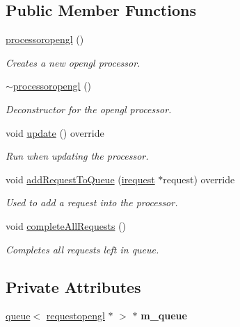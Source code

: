 \subsection*{Public Member Functions}
\begin{DoxyCompactItemize}
\item 
\hyperlink{classflounder_1_1processoropengl_a6cae6b14a140e49a2d8695c2be1816b2}{processoropengl} ()
\begin{DoxyCompactList}\small\item\em Creates a new opengl processor. \end{DoxyCompactList}\item 
\hyperlink{classflounder_1_1processoropengl_a6ee7c280950f4579915069d83225eaec}{$\sim$processoropengl} ()
\begin{DoxyCompactList}\small\item\em Deconstructor for the opengl processor. \end{DoxyCompactList}\item 
void \hyperlink{classflounder_1_1processoropengl_ad3ca7ada749d785e44fa2b536839f684}{update} () override
\begin{DoxyCompactList}\small\item\em Run when updating the processor. \end{DoxyCompactList}\item 
void \hyperlink{classflounder_1_1processoropengl_a5063ad5c1f350f26733a748a7e039a9a}{add\+Request\+To\+Queue} (\hyperlink{classflounder_1_1irequest}{irequest} $\ast$request) override
\begin{DoxyCompactList}\small\item\em Used to add a request into the processor. \end{DoxyCompactList}\item 
void \hyperlink{classflounder_1_1processoropengl_aa1c943138ae967f19584b7841afdfa2a}{complete\+All\+Requests} ()
\begin{DoxyCompactList}\small\item\em Completes all requests left in queue. \end{DoxyCompactList}\end{DoxyCompactItemize}
\subsection*{Private Attributes}
\begin{DoxyCompactItemize}
\item 
\mbox{\label{classflounder_1_1processoropengl_ad7fed4222e4b75c56bfce7c593cbe7c6}} 
\hyperlink{classflounder_1_1queue}{queue}$<$ \hyperlink{classflounder_1_1requestopengl}{requestopengl} $\ast$ $>$ $\ast$ {\bfseries m\+\_\+queue}
\end{DoxyCompactItemize}
